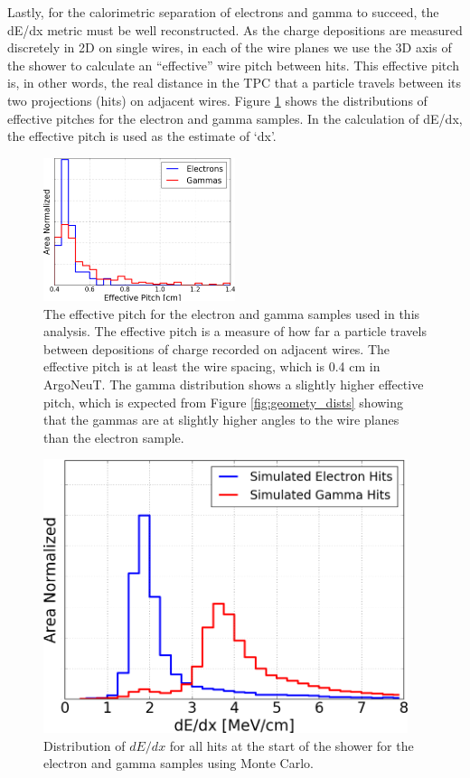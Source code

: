 Lastly, for the calorimetric separation of electrons and gamma to succeed, the dE/dx metric must be well reconstructed. As the charge depositions are measured discretely in 2D on single wires, in each of the wire planes we use the 3D axis of the shower to calculate an ``effective'' wire pitch between hits.  This effective pitch is, in other words, the real distance in the TPC that a particle travels between its two projections (hits) on adjacent wires. Figure \ref{fig:effective_pitch} shows the distributions of effective pitches for the electron and gamma samples.  In the calculation of dE/dx, the effective pitch is used as the estimate of `dx'.

\begin{figure}[htbp]
  \centering
  \includegraphics[width=0.5\textwidth]{emshower_figures/effective_pitch_trimmed.png}
  \caption[Effective Pitch]{The effective pitch for the electron and gamma samples used in this analysis.  The effective pitch is a measure of how far a particle travels between depositions of charge recorded on adjacent wires.  The effective pitch is at least the wire spacing, which is 0.4 cm in ArgoNeuT.  The gamma distribution shows a slightly higher effective pitch, which is expected from Figure \ref{fig:geomety_dists} showing that the gammas are at slightly higher angles to the wire planes than the electron sample.}
  \label{fig:effective_pitch}
\end{figure}

\begin{figure}[htb]
  \centering
  \includegraphics[width=0.95\textwidth]{emshower_figures/mcLandaus_trimmed.png}
  \caption{Distribution of $dE/dx$ for all hits at the start of the shower for the electron and gamma samples using Monte Carlo.}
  \label{fig:mc_landaus}
 \end{figure} 

